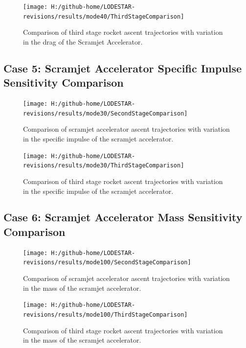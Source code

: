 \begin{figure}[!th]
\centering
\texttt{[image: H:/github-home/LODESTAR-revisions/results/mode40/ThirdStageComparison]}
\caption{Comparison of third stage rocket ascent trajectories with variation in the drag of the Scramjet Accelerator.}
\label{fig:ThirdStageComparison3}
\end{figure}
\FloatBarrier
\clearpage
\subsection{Case 5: Scramjet Accelerator Specific Impulse Sensitivity Comparison}\label{sec:app_comparison30}


\begin{figure}[!th]
	\centering
	\texttt{[image: H:/github-home/LODESTAR-revisions/results/mode30/SecondStageComparison]}
	\caption{Comparison of scramjet accelerator ascent trajectories with variation in the specific impulse of the scramjet accelerator.}
	\label{fig:SecondStageComparison2}
	
\end{figure}
\begin{figure}[!th]
	\centering
	\texttt{[image: H:/github-home/LODESTAR-revisions/results/mode30/ThirdStageComparison]}
	\caption{Comparison of third stage rocket ascent trajectories with variation in the specific impulse of the scramjet accelerator.}
	\label{fig:ThirdStageComparison2}
\end{figure}
\FloatBarrier
\clearpage
\subsection{Case 6: Scramjet Accelerator Mass Sensitivity Comparison}\label{sec:app_comparison100}

\begin{figure}[!th]
\centering
\texttt{[image: H:/github-home/LODESTAR-revisions/results/mode100/SecondStageComparison]}
\caption{Comparison of scramjet accelerator ascent trajectories with variation in the mass of the scramjet accelerator.}
\label{fig:SecondStageComparison4}
\end{figure}

\begin{figure}[!th]
\centering
\texttt{[image: H:/github-home/LODESTAR-revisions/results/mode100/ThirdStageComparison]}
\caption{Comparison of third stage rocket ascent trajectories with variation in the mass of the scramjet accelerator.}
\label{fig:ThirdStageComparison4}
\end{figure}
\FloatBarrier
\clearpage
